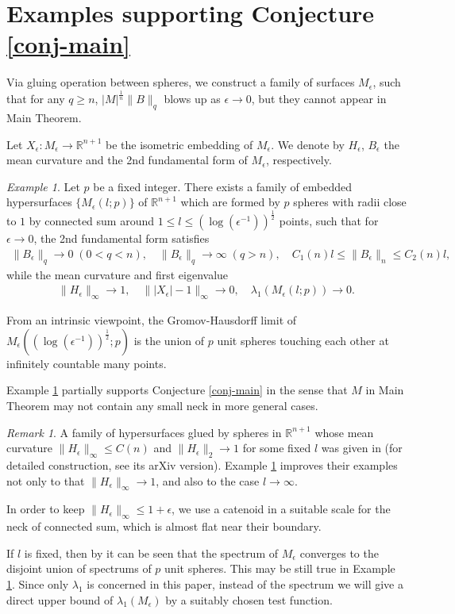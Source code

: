 \documentclass{amsart}
\numberwithin{equation}{section}
\theoremstyle{remark}
\newtheorem{rem}[theo]{Remark}
\newtheorem{example}[theo]{Example}
\renewcommand{\(}{\left(}
\renewcommand{\)}{\right)}
\renewcommand{\~}{\tilde}
\renewcommand{\-}{\overline}
\newcommand{\R}{\mathbb{R}}
\newcommand{\e}{\epsilon}
\renewcommand{\l}{\lambda}
\newcommand{\ra}{\rightarrow}
\begin{document}
\section{Examples supporting Conjecture \ref{conj-main}}\label{sec:6}

Via gluing operation between spheres, we construct a family of surfaces $M_\e$, such that for any $q\ge n$, $|M|^{\frac{1}{n}}\|B\|_q$ blows up as $\epsilon\to 0$, but they cannot appear in Main Theorem. 

Let $X_\e: M_\e \ra \R^{n+1}$ be the isometric embedding of $M_\e$. We denote by $H_\e$, $B_\e$ the mean curvature and the 2nd fundamental form of $M_\e$, respectively.

\begin{example}\label{counter-example}
	Let $p$ be a fixed integer. There exists a family of embedded hypersurfaces $\{M_\e(l;p)\}$ of $\R^{n+1}$ which are formed by $p$ spheres with radii close to $1$ by connected sum around $1\le l\le (\log (\epsilon^{-1}))^{\frac{1}{2}}$ points, such that for $\e \ra 0$, the 2nd fundamental form satisfies
	\begin{align}\label{7.1}
	\|B_\e\|_q \to 0 \; (0< q<n), \quad \|B_\e\|_q \ra \infty\; (q>n),  \quad 
	 C_1(n)l\le \|B_\e\|_n \leq C_2(n)l,
	\end{align}
while the mean curvature and first eigenvalue
\begin{align}\label{7.2}
\|H_\e\|_\infty \ra 1, \quad 	\||X_\e|-1\|_\infty\ra 0, \quad \l_1(M_\e(l;p)) \ra 0.
\end{align} 
\end{example}
From an intrinsic viewpoint, the Gromov-Hausdorff limit of $M_\epsilon((\log (\epsilon^{-1}))^{\frac{1}{2}};p)$ is the union of $p$ unit spheres touching each other at infinitely countable many points. 

Example \ref{counter-example} partially supports Conjecture \ref{conj-main} in the sense that $M$ in Main Theorem may not contain any small neck in more general cases.

\begin{rem}
	A family of hypersurfaces glued by spheres in $\mathbb{R}^{n+1}$ whose mean curvature $\|H_\e\|_\infty\le C(n)$ and $\|H_\e\|_2\to 1$ for some fixed $l$ was given in \cite{Aubry-Grosjean} (for detailed construction, see its arXiv version). 	
	Example \ref{counter-example}  improves their examples not only
	to that $\|H_\epsilon\|_\infty\to 1$, and also to the case $l\to \infty$.
	
	In order to keep $\|H_\epsilon\|_\infty\le 1+\e$, we use a catenoid in a suitable scale for the neck of connected sum, which is almost flat near their boundary.
	
	If $l$ is fixed, then by \cite{Aubry-Grosjean} it can be seen that the spectrum of $M_\e$ converges to the disjoint union of spectrums of $p$ unit spheres. This may be still true in Example \ref{counter-example}. Since only $\lambda_1$ is concerned in this paper, instead of the spectrum we will give a direct upper bound of $\lambda_1(M_\epsilon)$ by a suitably chosen test function.
\end{rem}
\end{document}
